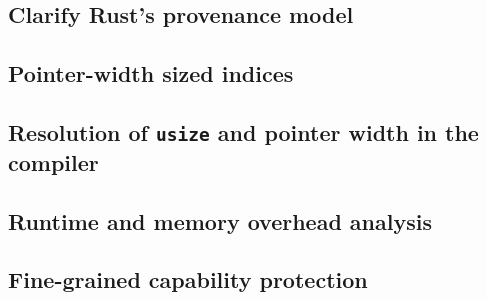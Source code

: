 \documentclass[dissertation.tex]{subfiles}
\begin{document}
\subsection{Clarify Rust's provenance model}

\subsection{Pointer-width sized indices}

\subsection{Resolution of \texttt{usize} and pointer width in the compiler}

\subsection{Runtime and memory overhead analysis}

\subsection{Fine-grained capability protection}
\end{document}
